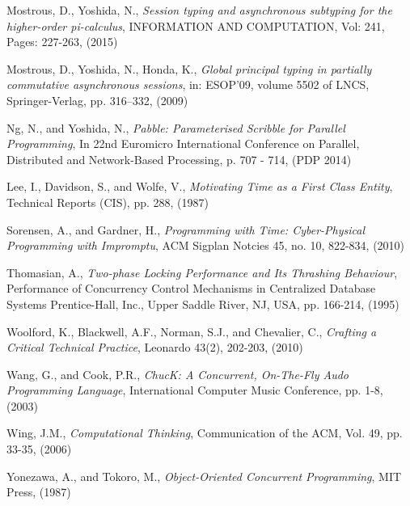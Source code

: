 \documentclass[11pt, abstracton, twoside]{scrartcl}
\begin{document}
\begin{thebibliography}{9}
  Mostrous, D., Yoshida, N., 
  \emph{Session typing and asynchronous subtyping for the higher-order pi-calculus}, 
  INFORMATION AND COMPUTATION, Vol: 241, 
  Pages: 227-263,
  (2015)

  Mostrous, D., Yoshida, N., Honda, K., 
  \emph{Global principal typing in partially
  commutative asynchronous sessions},
  in: ESOP’09, volume 5502 of
  LNCS, 
  Springer-Verlag, 
  pp. 316–332,
  (2009)

  Ng, N., and Yoshida, N.,
  \emph{Pabble: Parameterised Scribble for Parallel Programming},
  In 22nd Euromicro International Conference on Parallel, Distributed and Network-Based Processing, 
  p. 707 - 714,
  (PDP 2014)

  Lee, I., Davidson, S., and Wolfe, V.,
  \emph{Motivating Time as a First Class Entity},
  Technical Reports (CIS),
  pp. 288,
  (1987)

  Sorensen, A., and Gardner, H.,
  \emph{Programming with Time: Cyber-Physical Programming with Impromptu},
  ACM Sigplan Notcies 45,
  no. 10, 822-834,
  (2010)

  Thomasian, A.,
  \emph{Two-phase Locking Performance and Its Thrashing Behaviour},
  Performance of Concurrency Control Mechanisms in Centralized Database Systems
  Prentice-Hall, Inc.,
  Upper Saddle River, NJ, USA,
  pp. 166-214,
  (1995)

  Woolford, K., Blackwell, A.F., Norman, S.J., and Chevalier, C.,
  \emph{Crafting a Critical Technical Practice},
  Leonardo 43(2),
  202-203,
  (2010)

  Wang, G., and Cook, P.R.,
  \emph{ChucK: A Concurrent, On-The-Fly Audo Programming Language},
  International Computer Music Conference,
  pp. 1-8,
  (2003)

  Wing, J.M.,
  \emph{Computational Thinking},
  Communication of the ACM,
  Vol. 49, pp. 33-35,
  (2006)

  Yonezawa, A., and Tokoro, M.,
  \emph{Object-Oriented Concurrent Programming},
  MIT Press,
  (1987)

\end{thebibliography}
\end{document}

